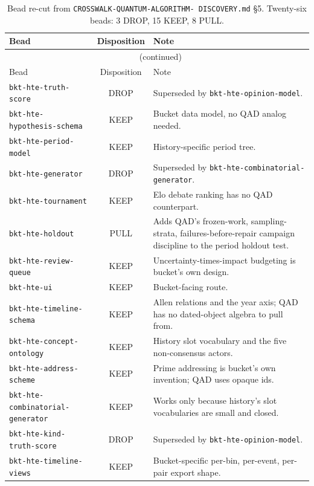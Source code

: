 \documentclass[11pt]{article}
\begin{document}
\begin{longtable}{@{}p{4.4cm}c p{7.7cm}@{}}
  \caption{Bead re-cut from \texttt{CROSSWALK-QUANTUM-ALGORITHM-
    DISCOVERY.md} \S5. Twenty-six beads: 3 DROP, 15 KEEP, 8 PULL.}
  \label{tab:beads} \\
  \toprule
  Bead & Disposition & Note \\
  \midrule
  \endfirsthead
  \multicolumn{3}{c}{\tablename\ \thetable{} (continued)} \\
  \toprule
  Bead & Disposition & Note \\
  \midrule
  \endhead
  \bottomrule
  \endfoot
  \bottomrule
  \endlastfoot
  \texttt{bkt-hte-truth-score} & DROP & Superseded by \texttt{bkt-hte-opinion-model}. \\
  \texttt{bkt-hte-hypothesis-schema} & KEEP & Bucket data model, no QAD analog needed. \\
  \texttt{bkt-hte-period-model} & KEEP & History-specific period tree. \\
  \texttt{bkt-hte-generator} & DROP & Superseded by \texttt{bkt-hte-combinatorial-generator}. \\
  \texttt{bkt-hte-tournament} & KEEP & Elo debate ranking has no QAD counterpart. \\
  \texttt{bkt-hte-holdout} & PULL & Adds QAD's frozen-work, sampling-strata, failures-before-repair campaign discipline to the period holdout test. \\
  \texttt{bkt-hte-review-queue} & KEEP & Uncertainty-times-impact budgeting is bucket's own design. \\
  \texttt{bkt-hte-ui} & KEEP & Bucket-facing route. \\
  \texttt{bkt-hte-timeline-schema} & KEEP & Allen relations and the year axis; QAD has no dated-object algebra to pull from. \\
  \texttt{bkt-hte-concept-ontology} & KEEP & History slot vocabulary and the five non-consensus actors. \\
  \texttt{bkt-hte-address-scheme} & KEEP & Prime addressing is bucket's own invention; QAD uses opaque ids. \\
  \texttt{bkt-hte-combinatorial-generator} & KEEP & Works only because history's slot vocabularies are small and closed. \\
  \texttt{bkt-hte-kind-truth-score} & DROP & Superseded by \texttt{bkt-hte-opinion-model}. \\
  \texttt{bkt-hte-timeline-views} & KEEP & Bucket-specific per-bin, per-event, per-pair export shape. \\

\end{longtable}
\end{document}
